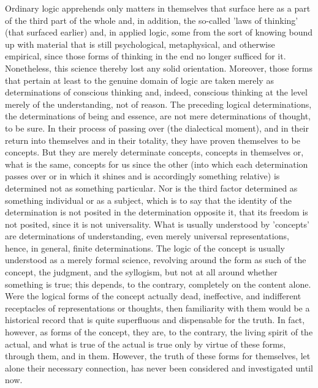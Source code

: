    Ordinary logic apprehends only matters in themselves that surface here
    as a part of the third part of the whole and, in addition,
    the so-called 'laws of thinking' (that surfaced earlier) and,
    in applied logic, some from the sort of knowing bound up with material
    that is still psychological, metaphysical, and otherwise empirical,
    since those forms of thinking in the end no longer sufficed for it.
    Nonetheless, this science thereby lost any solid orientation.
    Moreover, those forms that pertain at least to the genuine domain of logic
    are taken merely as determinations of conscious thinking and, indeed,
    conscious thinking at the level merely of the understanding, not of reason.
    The preceding logical determinations, the determinations of
    being and essence, are not mere determinations of thought, to be sure.
    In their process of passing over (the dialectical moment), and
    in their return into themselves and in their totality,
    they have proven themselves to be concepts.
    But they are merely determinate concepts, concepts in themselves or,
    what is the same, concepts for us since the other
    (into which each determination passes over or in which it shines and
    is accordingly something relative)
    is determined not as something particular.
    Nor is the third factor determined as something individual or as a subject,
    which is to say that the identity of the determination is not posited in
    the determination opposite it, that its freedom is not posited,
    since it is not universality.
    What is usually understood by 'concepts' are determinations of understanding,
    even merely universal representations, hence, in general, finite determinations.
    The logic of the concept is usually understood as a merely formal science,
    revolving around the form as such of the concept, the judgment, and the syllogism,
    but not at all around whether something is true;
    this depends, to the contrary, completely on the content alone.
    Were the logical forms of the concept actually dead, ineffective,
    and  indifferent receptacles of representations or thoughts,
    then familiarity with them would be a historical record that
    is quite superfluous and dispensable for the truth.
    In fact, however, as forms of the concept, they are, to the contrary,
    the living spirit of the actual, and what is true of the actual is true
    only by virtue of these forms, through them, and in them.
    However, the truth of these forms for themselves,
    let alone their necessary connection,
    has never been considered and investigated until now.

